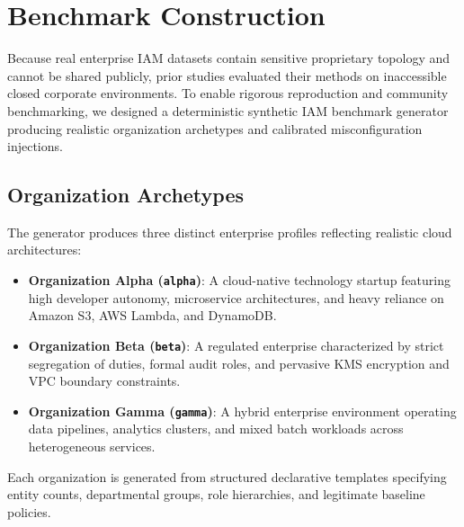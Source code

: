 \section{Benchmark Construction}
\label{sec:benchmark}

Because real enterprise IAM datasets contain sensitive proprietary topology and cannot be shared publicly, prior studies evaluated their methods on inaccessible closed corporate environments. To enable rigorous reproduction and community benchmarking, we designed a deterministic synthetic IAM benchmark generator producing realistic organization archetypes and calibrated misconfiguration injections.

\subsection{Organization Archetypes}
The generator produces three distinct enterprise profiles reflecting realistic cloud architectures:
\begin{itemize}
    \item \textbf{Organization Alpha (\texttt{alpha})}: A cloud-native technology startup featuring high developer autonomy, microservice architectures, and heavy reliance on Amazon S3, AWS Lambda, and DynamoDB.
    \item \textbf{Organization Beta (\texttt{beta})}: A regulated enterprise characterized by strict segregation of duties, formal audit roles, and pervasive KMS encryption and VPC boundary constraints.
    \item \textbf{Organization Gamma (\texttt{gamma})}: A hybrid enterprise environment operating data pipelines, analytics clusters, and mixed batch workloads across heterogeneous services.
\end{itemize}

Each organization is generated from structured declarative templates specifying entity counts, departmental groups, role hierarchies, and legitimate baseline policies.

